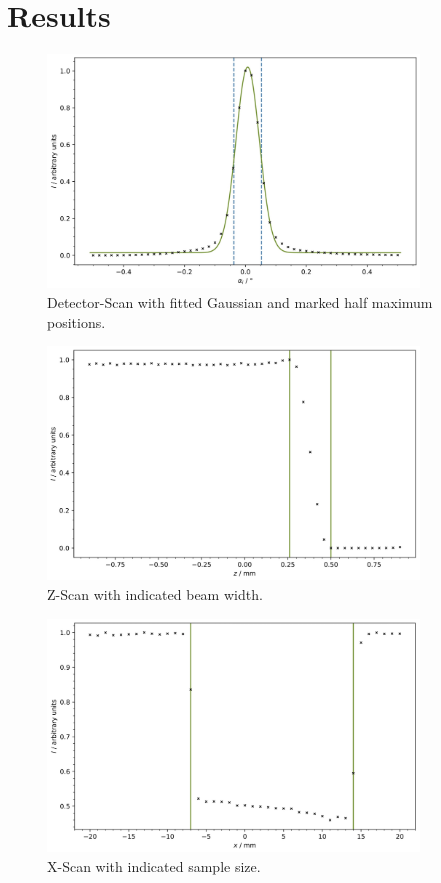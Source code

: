 \section{Results}

\begin{figure}[H]
	\centering
	\includegraphics[width=0.88\textwidth]{content/plots/1.jpg}
	\caption{Detector-Scan with fitted Gaussian and marked half maximum positions.}
	\label{fig:detector-scan}
\end{figure}

\begin{figure}[H]
	\centering
	\includegraphics[width=0.88\textwidth]{content/plots/2.jpg}
	\caption{Z-Scan with indicated beam width.}
	\label{fig:z-scan}
\end{figure}

\begin{figure}[H]
	\centering
	\includegraphics[width=0.88\textwidth]{content/plots/3.jpg}
	\caption{X-Scan with indicated sample size.}
	\label{fig:x-scan}
\end{figure}

